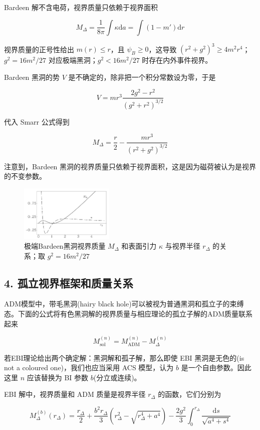 \documentclass[aps,prl,preprint,groupedaddress,showkeys]{revtex4-2}
\begin{document}
Bardeen 解不含电荷，视界质量只依赖于视界面积

$$
M_\Delta
=\frac{1 }{8\pi } \int\kappa \mathrm{d}a
=\int \left(1-m' \right)\mathrm{d}r
$$

视界质量的正号性给出 $m(r)\leq r$，且 $\psi_B\geq 0$，这导致 $(r^2+g^2)^3\geq 4m^2 r^4$；$g^2=16m^2/27$ 对应极端黑洞；$g^2<16m^2/27$ 时存在内外事件视界。

Bardeen 黑洞的势 $V$ 是不确定的，除非把一个积分常数设为零，于是
    
$$
V = m r^3 \frac{2g^2 - r^2 }{\left(g^2 + r^2 \right)^{3/2} }
$$

代入 Smarr 公式得到

$$
M_\Delta = \frac{r }{2 } - \frac{m r^3 }{\left(r^2+g^2 \right)^{3/2} } 
$$

注意到，Bardeen 黑洞的视界质量只依赖于视界面积，这是因为磁荷被认为是视界的不变参数。

\begin{figure}[htbp]
    \centering
    \includegraphics[width=0.4\textwidth]{fig/fig8.png}
    \caption{极端Bardeen黑洞视界质量 $M_\Delta$ 和表面引力 $\kappa$ 与视界半径 $r_\Delta$ 的关系；取 $g^2=16m^2/27 $}
\end{figure}

\subsection{4. 孤立视界框架和质量关系}

ADM模型中，带毛黑洞(hairy black hole)可以被视为普通黑洞和孤立子的束缚态。下面的公式将有色黑洞解的视界质量与相应理论的孤立子解的ADM质量联系起来\cite{ashtekar2000isolated}

$$
M_{\mathrm{sol}}^{(n)} = M_{\mathrm{ADM}}^{(n)} - M_\Delta^{(n)} 
$$

若EBI理论给出两个确定解：黑洞解和孤子解，那么即使 EBI 黑洞是无色的(is not a coloured one)，我们也应当采用 ACS 模型，认为 $b$ 是一个自由参数。因此这里 $n$ 应该替换为 BI 参数 $b$(分立或连续)。 

EBI 解中，视界质量和 ADM 质量是视界半径 $r_\Delta$ 的函数，它们分别为

$$
M_\Delta^{(b)}(r_\Delta)
=\frac{r_\Delta }{2 } + \frac{b^2 r_\Delta }{3 } \left(r_\Delta^2 - \sqrt{r_\Delta^4 + a^4} \right) - \frac{2g^2 }{3 } \int_0^{r_\Delta} \frac{\mathrm{d}s }{\sqrt{a^4+s^4} } 
$$
\end{document}
